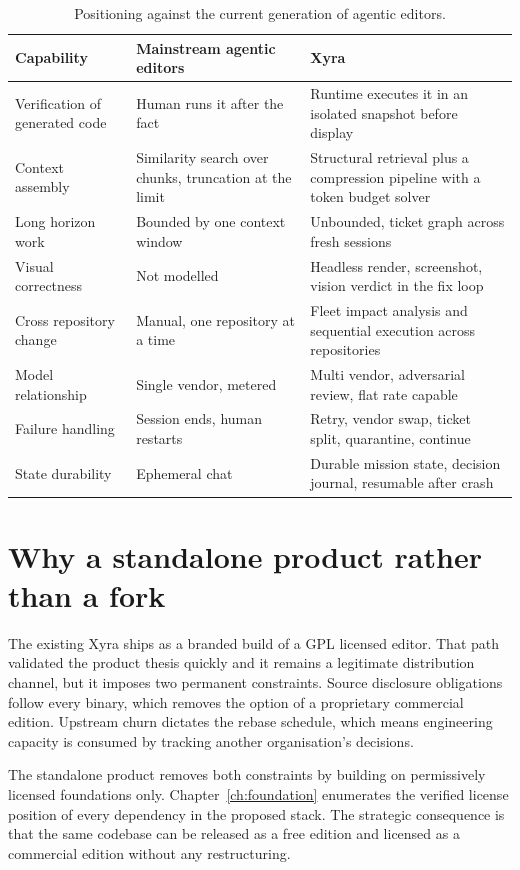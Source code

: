 \begin{table}[h]
\centering
\small
\begin{tabularx}{\textwidth}{l X X}
\toprule
\textbf{Capability} & \textbf{Mainstream agentic editors} & \textbf{Xyra} \\
\midrule
Verification of generated code & Human runs it after the fact & Runtime executes it in an isolated snapshot before display \\
Context assembly & Similarity search over chunks, truncation at the limit & Structural retrieval plus a compression pipeline with a token budget solver \\
Long horizon work & Bounded by one context window & Unbounded, ticket graph across fresh sessions \\
Visual correctness & Not modelled & Headless render, screenshot, vision verdict in the fix loop \\
Cross repository change & Manual, one repository at a time & Fleet impact analysis and sequential execution across repositories \\
Model relationship & Single vendor, metered & Multi vendor, adversarial review, flat rate capable \\
Failure handling & Session ends, human restarts & Retry, vendor swap, ticket split, quarantine, continue \\
State durability & Ephemeral chat & Durable mission state, decision journal, resumable after crash \\
\bottomrule
\end{tabularx}
\caption{Positioning against the current generation of agentic editors.}
\end{table}

\section{Why a standalone product rather than a fork}

The existing Xyra ships as a branded build of a GPL licensed editor. That path validated the
product thesis quickly and it remains a legitimate distribution channel, but it imposes two
permanent constraints. Source disclosure obligations follow every binary, which removes the
option of a proprietary commercial edition. Upstream churn dictates the rebase schedule,
which means engineering capacity is consumed by tracking another organisation's decisions.

The standalone product removes both constraints by building on permissively licensed
foundations only. Chapter~\ref{ch:foundation} enumerates the verified license position of
every dependency in the proposed stack. The strategic consequence is that the same codebase
can be released as a free edition and licensed as a commercial edition without any
restructuring.

